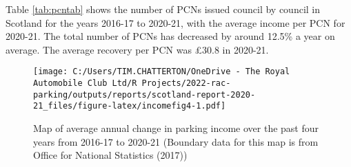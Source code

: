 \documentclass[
  12pt,
]{article}
\begin{document}
Table \ref{tab:pcntab} shows the number of PCNs issued council by council in Scotland for the years 2016-17 to 2020-21, with the average income per PCN for 2020-21. The total number of PCNs has decreased by around 12.5\% a year on average. The average recovery per PCN was £30.8 in 2020-21.

\begin{figure}
\centering
\texttt{[image: C:/Users/TIM.CHATTERTON/OneDrive - The Royal Automobile Club Ltd/R Projects/2022-rac-parking/outputs/reports/scotland-report-2020-21\_files/figure-latex/incomefig4-1.pdf]}
\caption{\label{fig:incomefig4}Map of average annual change in parking income over the past four years from 2016-17 to 2020-21 (Boundary data for this map is from Office for National Statistics (2017))}
\end{figure}

\newpage

\pagebreak

\begingroup\fontsize{10}{12}\selectfont
\end{document}
